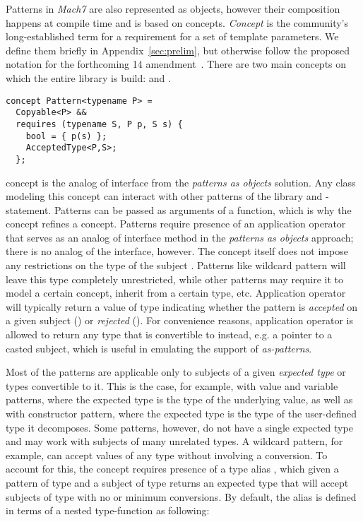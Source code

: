Patterns in \emph{Mach7} are also represented as objects, however their 
composition happens at compile time and is based on \Cpp{} concepts. 
\emph{Concept} is the \Cpp{} community's long-established term for a requirement 
for a set of template parameters. We define them briefly in Appendix~\ref{sec:prelim}, 
but otherwise follow the proposed notation for the forthcoming \Cpp{}14 
amendment~\cite{Concepts2012}. There are two main concepts on which the entire 
library is build:  and .

\begin{lstlisting}
concept Pattern<typename P> = 
  Copyable<P> &&
  requires (typename S, P p, S s) {
    bool = { p(s) };
    AcceptedType<P,S>;
  };
\end{lstlisting}

\noindent
{} concept is the analog of  interface from the 
\emph{patterns as objects} solution. Any class modeling this concept can 
interact with other patterns of the library and -statement. Patterns 
can be passed as arguments of a function, which is why the concept refines a
 concept. Patterns require presence of an application operator 
that serves as an analog of  interface 
method in the \emph{patterns as objects} approach; there is no analog of the 
 interface, however. The  concept itself does not 
impose any restrictions on the type of the subject . Patterns like 
wildcard pattern will leave this type completely unrestricted, while other 
patterns may require it to model a certain concept, inherit from a certain type, etc. 
Application operator will typically return a value of type  
indicating whether the pattern is \emph{accepted} on a given subject 
() or \emph{rejected} (). For convenience reasons, 
application operator is allowed to return any type that is convertible to 
 instead, e.g. a pointer to a casted subject, which is useful in 
emulating the support of \emph{as-patterns}.

Most of the patterns are applicable only to subjects of a given \emph{expected 
type} or types convertible to it. This is the case, for example, with value and 
variable patterns, where the expected type is the type of the underlying value, 
as well as with constructor pattern, where the expected type is the type of the 
user-defined type it decomposes. Some patterns, however, do not have a single 
expected type and may work with subjects of many unrelated types. A wildcard 
pattern, for example, can accept values of any type without involving a 
conversion. To account for this, the  concept requires presence of 
a type alias , which given a pattern of type  and 
a subject of type  returns an expected type  
that will accept subjects of type  with no or minimum conversions. 
By default, the alias is defined in terms of a nested type-function 
 as following:

